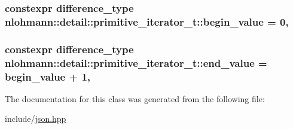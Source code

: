 \subsubsection[{\texorpdfstring{begin\+\_\+value}{begin_value}}]{\setlength{\rightskip}{0pt plus 5cm}constexpr {\bf difference\+\_\+type} nlohmann\+::detail\+::primitive\+\_\+iterator\+\_\+t\+::begin\+\_\+value = 0\hspace{0.3cm}{\ttfamily [static]}, {\ttfamily [private]}}\hypertarget{classnlohmann_1_1detail_1_1primitive__iterator__t_afcb3bcf9da8aa95bd82067d1a67c2326}{}\label{classnlohmann_1_1detail_1_1primitive__iterator__t_afcb3bcf9da8aa95bd82067d1a67c2326}
\subsubsection[{\texorpdfstring{end\+\_\+value}{end_value}}]{\setlength{\rightskip}{0pt plus 5cm}constexpr {\bf difference\+\_\+type} nlohmann\+::detail\+::primitive\+\_\+iterator\+\_\+t\+::end\+\_\+value = {\bf begin\+\_\+value} + 1\hspace{0.3cm}{\ttfamily [static]}, {\ttfamily [private]}}\hypertarget{classnlohmann_1_1detail_1_1primitive__iterator__t_aa37c37da44f19e6ec1d7d4a9910511c7}{}\label{classnlohmann_1_1detail_1_1primitive__iterator__t_aa37c37da44f19e6ec1d7d4a9910511c7}


The documentation for this class was generated from the following file\+:\begin{DoxyCompactItemize}
\item 
include/\hyperlink{json_8hpp}{json.\+hpp}\end{DoxyCompactItemize}
